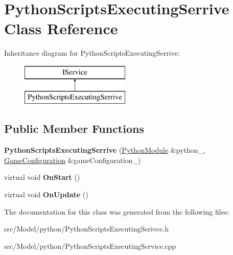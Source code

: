 \hypertarget{classPythonScriptsExecutingSerrive}{}\section{Python\+Scripts\+Executing\+Serrive Class Reference}
\label{classPythonScriptsExecutingSerrive}
Inheritance diagram for Python\+Scripts\+Executing\+Serrive\+:\begin{figure}[H]
\begin{center}
\leavevmode
\includegraphics[height=2.000000cm]{classPythonScriptsExecutingSerrive}
\end{center}
\end{figure}
\subsection*{Public Member Functions}
\begin{DoxyCompactItemize}
\item 
{\bfseries Python\+Scripts\+Executing\+Serrive} (\hyperlink{classPythonModule}{Python\+Module} \&python\+\_\+, \hyperlink{classGameConfiguration}{Game\+Configuration} \&game\+Configuration\+\_\+)\hypertarget{classPythonScriptsExecutingSerrive_ad6a6567ab30f16c1ca6f3e9477a011bf}{}\label{classPythonScriptsExecutingSerrive_ad6a6567ab30f16c1ca6f3e9477a011bf}

\item 
virtual void {\bfseries On\+Start} ()\hypertarget{classPythonScriptsExecutingSerrive_ad95b56c41949d4fd5e777d6e03d3594a}{}\label{classPythonScriptsExecutingSerrive_ad95b56c41949d4fd5e777d6e03d3594a}

\item 
virtual void {\bfseries On\+Update} ()\hypertarget{classPythonScriptsExecutingSerrive_ae9f72a04df459b1ebcc6cce6c5a928a2}{}\label{classPythonScriptsExecutingSerrive_ae9f72a04df459b1ebcc6cce6c5a928a2}

\end{DoxyCompactItemize}


The documentation for this class was generated from the following files\+:\begin{DoxyCompactItemize}
\item 
src/\+Model/python/Python\+Scripts\+Executing\+Serivce.\+h\item 
src/\+Model/python/Python\+Scripts\+Executing\+Service.\+cpp\end{DoxyCompactItemize}
